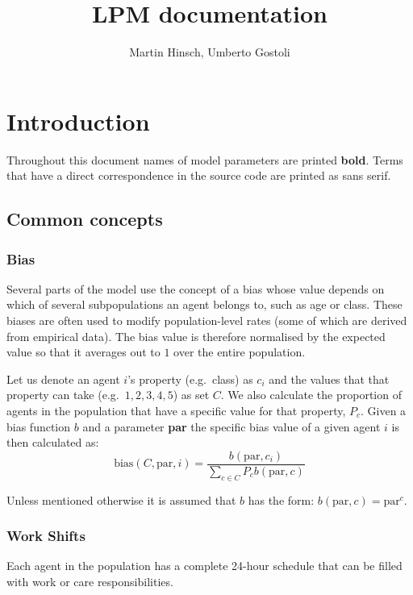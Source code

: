 \documentclass{article}
\title{LPM documentation }
\author{Martin Hinsch, Umberto Gostoli}
\begin{document}
\maketitle

\section{Introduction}

Throughout this document names of model parameters are printed \textbf{bold}. Terms that have a direct correspondence in the source code are printed as \textsf{sans serif}. 

\subsection{Common concepts}

\subsubsection*{Bias}\label{bias}

Several parts of the model use the concept of a bias whose value depends on which of several subpopulations an agent belongs to, such as age or class. These biases are often used to modify population-level rates (some of which are derived from empirical data). The bias value is therefore normalised by the expected value so that it averages out to $1$ over the entire population.

Let us denote an agent $i$'s property (e.g.~class) as $c_i$ and the values that that property can take (e.g.~$1,2,3,4,5$) as set $C$. We also calculate the proportion of agents in the population that have a specific value for that property, $P_c$. Given a bias function $b$ and a parameter \textbf{par} the specific bias value of a given agent $i$ is then calculated as:
\[
\textrm{bias}(C,\textrm{par},i) = \frac{b(\textrm{par}, c_i)}{\sum_{c \in C} P_c b(\textrm{par}, c)}
\]

Unless mentioned otherwise it is assumed that $b$ has the form: $b(\textrm{par}, c) = \textrm{par}^c$.

\subsubsection*{Work Shifts}\label{shifts}

Each agent in the population has a complete 24-hour schedule that can be filled with work or care responsibilities. 
\end{document}
